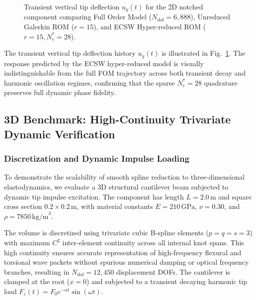 \begin{figure}[htbp]
\caption{Transient vertical tip deflection $u_y(t)$ for the 2D notched component comparing Full Order Model ($N_{\text{dof}} = 6,888$), Unreduced Galerkin ROM ($r=15$), and ECSW Hyper-reduced ROM ($r=15, N_e^*=28$).}
\label{fig:2d_transient_deflection}
\end{figure}

The transient vertical tip deflection history $u_y(t)$ is illustrated in Fig.~\ref{fig:2d_transient_deflection}. The response predicted by the ECSW hyper-reduced model is visually indistinguishable from the full FOM trajectory across both transient decay and harmonic oscillation regimes, confirming that the sparse $N_e^* = 28$ quadrature preserves full dynamic phase fidelity.

\subsection{3D Benchmark: High-Continuity Trivariate Dynamic Verification}
\label{subsec:3d_example}

\subsubsection{Discretization and Dynamic Impulse Loading}
To demonstrate the scalability of smooth spline reduction to three-dimensional elastodynamics, we evaluate a 3D structural cantilever beam subjected to dynamic tip impulse excitation. The component has length $L = 2.0\,\text{m}$ and square cross section $0.2 \times 0.2\,\text{m}$, with material constants $E = 210\,\text{GPa}$, $\nu = 0.30$, and $\rho = 7850\,\text{kg/m}^3$. 

The volume is discretized using trivariate cubic B-spline elements ($p = q = s = 3$) with maximum $C^2$ inter-element continuity across all internal knot spans. This high continuity ensures accurate representation of high-frequency flexural and torsional wave packets without spurious numerical damping or optical frequency branches, resulting in $N_{\text{dof}} = 12,450$ displacement DOFs. The cantilever is clamped at the root ($x = 0$) and subjected to a transient decaying harmonic tip load $F_z(t) = F_0 e^{-\alpha t} \sin(\omega t)$.

